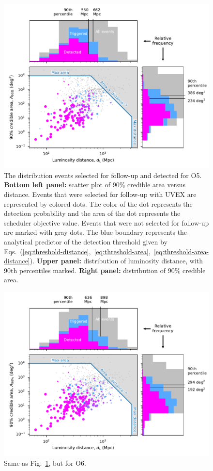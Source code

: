 \documentclass[twocolumn,times]{aastex631}
\begin{document}
\begin{figure}
    \centering
    \includegraphics{figures/area-distance-O5}
    \caption{\label{fig:area-distance-O5}The distribution events selected for follow-up and detected for O5. \textbf{Bottom left panel:} scatter plot of 90\% credible area versus distance. Events that were selected for follow-up with \ac{UVEX} are represented by colored dots. The color of the dot represents the detection probability and the area of the dot represents the scheduler objective value. Events that were not selected for follow-up are marked with gray dots. The blue boundary represents the analytical predictor of the detection threshold given by Eqs.~(\ref{eq:threshold-distance},~\ref{eq:threshold-area},~\ref{eq:threshold-area-distance}). \textbf{Upper panel:} distribution of luminosity distance, with 90th percentiles marked. \textbf{Right panel:} distribution of 90\% credible area.}
\end{figure}

\begin{figure}
    \centering
    \includegraphics{figures/area-distance-O6}
    \caption{\label{fig:area-distance-O6}Same as Fig.~\ref{fig:area-distance-O5}, but for O6.}
\end{figure}
\end{document}
